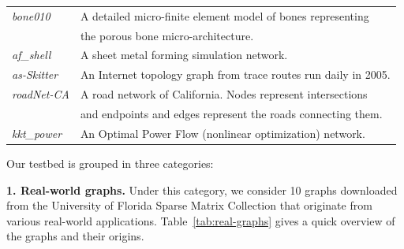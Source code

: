 \begin{table}[t]
\begin{tabular}{ll}
{\it bone010} \cite{vanRietbergen199569} &
A detailed micro-finite element model of bones representing \\
& the porous bone micro-architecture. \\ \hline
{\it af\_shell} \cite{Davis97theuniversity}  & A sheet metal forming simulation network. \\ \hline
{\it as-Skitter} \cite{Leskovec:2005:GOT:1081870.1081893} & An Internet topology graph from trace routes run daily in 2005. \\ \hline %
{\it roadNet-CA} \cite{Leskovec:2005:GOT:1081870.1081893} & A road network of California.
Nodes represent intersections \\ & and endpoints and edges represent the roads connecting them. \\ \hline %
{\it kkt\_power} \cite{Davis97theuniversity} & An Optimal Power Flow (nonlinear optimization) network. \\\hline
\end{tabular}
\end{table}

Our testbed is grouped in three categories:

{\bf 1. Real-world graphs. } 
Under this category, we consider 10 graphs downloaded from the 
University of Florida Sparse Matrix Collection  \cite{Davis97theuniversity} that originate
from various real-world applications. 
Table~\ref{tab:real-graphs} gives a quick overview of the graphs and their origins.
  

